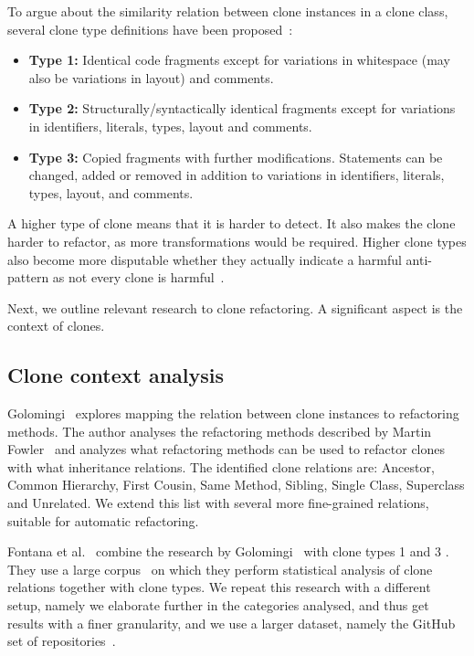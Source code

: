 \documentclass[runningheads]{llncs}
\begin{document}
To argue about the similarity relation between clone instances in a clone class, several clone type definitions have been proposed~\cite{roy2007survey}:
\begin{itemize}
    \item \textbf{Type 1:} Identical code fragments except for variations in whitespace (may also be variations in layout) and comments.
    \item \textbf{Type 2:} Structurally/syntactically identical fragments except for variations in identifiers, literals, types, layout and comments.
    \item \textbf{Type 3:} Copied fragments with further modifications. Statements can be changed, added or removed in addition to variations in identifiers, literals, types, layout, and comments.
\end{itemize}

A higher type of clone means that it is harder to detect. It also makes the clone harder to refactor, as more transformations would be required. Higher clone types also become more disputable whether they actually indicate a harmful anti-pattern as not every clone is harmful~\cite{jarzabek2010clones, kapser2008cloning}.

Next, we outline relevant research to clone refactoring. A significant aspect is the context of clones.

\subsection{Clone context analysis}\label{sec:rw:contextanalysis}
Golomingi~\cite{koni2001scenario} explores mapping the relation between clone instances to refactoring methods. The author analyses the refactoring methods described by Martin Fowler~\cite{fowler1999refactoring} and analyzes what refactoring methods can be used to refactor clones with what inheritance relations. The identified clone relations are: Ancestor, Common Hierarchy, First Cousin, Same Method, Sibling, Single Class, Superclass and Unrelated. We extend this list with several more fine-grained relations, suitable for automatic refactoring.

Fontana et al.~\cite{fontana2012duplicated, fontana2015duplicated} combine the research by Golomingi~\cite{koni2001scenario} with clone types 1 and 3 \cite{roy2007survey}. They use a large corpus~\cite{tempero2010qualitas} on which they perform statistical analysis of clone relations together with clone types. We repeat this research with a different setup, namely we elaborate further in the categories analysed, and thus get results with a finer granularity, and we use a larger dataset, namely the GitHub set of repositories~\cite{githubCorpus2013}. 
\end{document}
